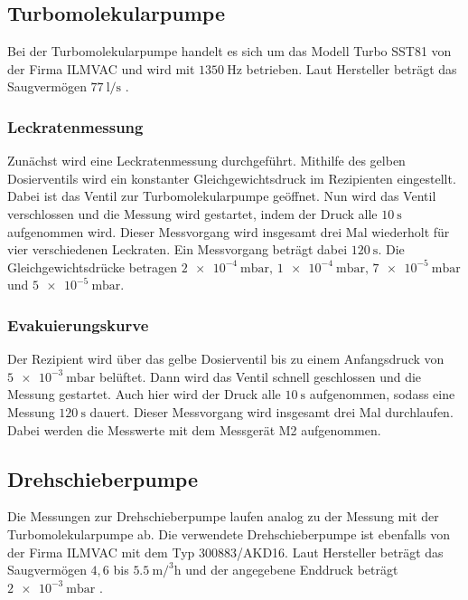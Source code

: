         \subsection{Turbomolekularpumpe}
            Bei der Turbomolekularpumpe handelt es sich um das Modell Turbo SST81 von der Firma ILMVAC und wird mit $\SI{1350}{\hertz}$ betrieben.
            Laut Hersteller beträgt das Saugvermögen $\SI{77}{\litre\per\second}$ \cite{anleitung}.

            \subsubsection{Leckratenmessung}
                Zunächst wird eine Leckratenmessung durchgeführt.
                Mithilfe des gelben Dosierventils wird ein konstanter Gleichgewichtsdruck im Rezipienten eingestellt.
                Dabei ist das Ventil zur Turbomolekularpumpe geöffnet.
                Nun wird das Ventil verschlossen und die Messung wird gestartet, indem der Druck alle $\SI{10}{\second}$ aufgenommen wird.
                Dieser Messvorgang wird insgesamt drei Mal wiederholt für vier verschiedenen Leckraten.
                Ein Messvorgang beträgt dabei $\SI{120}{\second}$.
                Die Gleichgewichtsdrücke betragen $\SI{2e-4}{\milli\bar}, \, \SI{1e-4}{\milli\bar}, \, \SI{7e-5}{\milli\bar}$ und $\SI{5e-5}{\milli\bar}$.

            \subsubsection{Evakuierungskurve}
                Der Rezipient wird über das gelbe Dosierventil bis zu einem Anfangsdruck von $\SI{5e-3}{\milli\bar}$ belüftet.
                Dann wird das Ventil schnell geschlossen und die Messung gestartet.
                Auch hier wird der Druck alle $\SI{10}{\second}$ aufgenommen, sodass eine Messung $\SI{120}{\second}$ dauert.
                Dieser Messvorgang wird insgesamt drei Mal durchlaufen.
                Dabei werden die Messwerte mit dem Messgerät M2 aufgenommen.

        \subsection{Drehschieberpumpe}
            Die Messungen zur Drehschieberpumpe laufen analog zu der Messung mit der Turbomolekularpumpe ab.
            Die verwendete Drehschieberpumpe ist ebenfalls von der Firma ILMVAC mit dem Typ 300883/AKD16.
            Laut Hersteller beträgt das Saugvermögen $4,6$ bis $\SI{5.5}{\metre\cubic\per\hour}$ und der angegebene Enddruck beträgt $\SI{2e-3}{\milli\bar}$ \cite{anleitung}.

